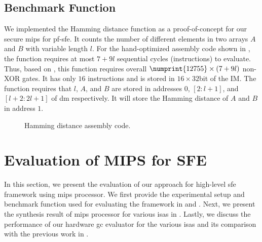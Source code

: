 \subsection{Benchmark Function}
We implemented the Hamming distance function as a proof-of-concept for our secure \gls{mips} for \acrshort{pf-sfe}.
It counts the number of different elements in two arrays $A$ and $B$ with variable length $l$.
For the hand-optimized assembly code shown in , the function requires at most $7+9l$ sequential cycles (instructions) to evaluate.
Thus, based on , this function requires overall $\numprint{12755}\times(7+9l)$ non-XOR gates.
It has only $16$ instructions and is stored in $16\times32$bit of the IM.
The function requires that $l$, $A$, and $B$ are stored in addresses $0$, $[2:l+1]$, and $[l+2:2l+1]$ of \acrfull{dm} respectively.
It will store the Hamming distance of $A$ and $B$ in address $1$.



\begin{figure}[ht]
\centering
\resizebox{!}{0.45\textheight}{%

}
\caption{Hamming distance assembly code.}\label{figure:hamminassembly}
\end{figure}

\section{Evaluation of MIPS for SFE} \label{sec:eval-mips-sfe}
In this section, we present the evaluation of our approach for high-level \acrshort{sfe} framework using \gls{mips} processor.
We first provide the experimental setup and benchmark function used for evaluating the framework in  and .
Next, we present the synthesis result of \gls{mips} processor for various \acrshort{isa}s in .
Lastly, we discuss the performance of our hardware \acrshort{gc} evaluator for the various \acrshort{isa}s and its comparison with the previous work in .

